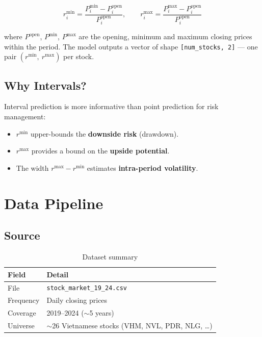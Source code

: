 \documentclass[12pt,a4paper]{article}
\newcommand{\codeinline}[1]{\texttt{\small #1}}
\begin{document}
\begin{equation}
  r^{\min}_i = \frac{P^{\min}_i - P^{\text{open}}_i}{P^{\text{open}}_i}, \qquad
  r^{\max}_i = \frac{P^{\max}_i - P^{\text{open}}_i}{P^{\text{open}}_i}
\end{equation}

where $P^{\text{open}}$, $P^{\min}$, $P^{\max}$ are the opening, minimum and maximum closing prices within the period. The model outputs a vector of shape \codeinline{[num\_stocks, 2]} — one pair $(r^{\min},\ r^{\max})$ per stock.

\subsection{Why Intervals?}
Interval prediction is more informative than point prediction for risk management:
\begin{itemize}[leftmargin=2em]
  \item $r^{\min}$ upper-bounds the \textbf{downside risk} (drawdown).
  \item $r^{\max}$ provides a bound on the \textbf{upside potential}.
  \item The width $r^{\max} - r^{\min}$ estimates \textbf{intra-period volatility}.
\end{itemize}

\section{Data Pipeline}

\subsection{Source}

\begin{table}[H]
\centering
\begin{tabular}{L{3cm} L{9cm}}
\toprule
\textbf{Field} & \textbf{Detail} \\
\midrule
File      & \codeinline{stock\_market\_19\_24.csv} \\
Frequency & Daily closing prices \\
Coverage  & 2019–2024 ($\sim$5 years) \\
Universe  & $\sim$26 Vietnamese stocks (VHM, NVL, PDR, NLG, \ldots) \\
\bottomrule
\end{tabular}
\caption{Dataset summary}
\end{table}
\end{document}
